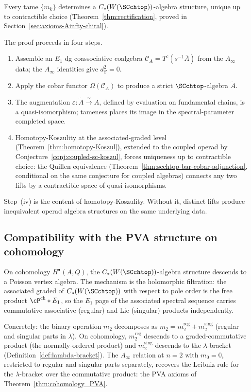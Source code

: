 Every tame $\{m_k\}$ determines a $C_\ast(W(\SCchtop))$-algebra
structure, unique up to contractible choice (Theorem~\ref{thm:rectification},
proved in Section~\ref{sec:axioms-Ainfty-chiral}).

The proof proceeds in four steps.
\begin{enumerate}[label=\textup{(\roman*)}]
\item Assemble an $E_1$ dg coassociative coalgebra $\mathcal{C}_A = T^c(s^{-1}\bar A)$
 from the $A_\infty$ data; the $A_\infty$ identities give $d_{\mathcal{C}}^2 = 0$.
\item Apply the cobar functor $\Omega(\mathcal{C}_A)$ to produce a strict
 $\SCchtop$-algebra $\widetilde A$.
\item The augmentation $\varepsilon\colon \widetilde A \xrightarrow{\;\sim\;} A$,
 defined by evaluation on fundamental chains, is a quasi-isomorphism;
 tameness places its image in the spectral-parameter completed space.
\item Homotopy-Koszulity at the associated-graded level
 (Theorem~\ref{thm:homotopy-Koszul}), extended to the coupled
 operad by Conjecture~\ref{conj:coupled-sc-koszul},
 forces uniqueness up to contractible choice: the Quillen equivalence
 (Theorem~\ref{thm:scchtop-bar-cobar-adjunction}, conditional on the
 same conjecture for coupled algebras) connects any two lifts
 by a contractible space of quasi-isomorphisms.
\end{enumerate}

Step~(iv) is the content of homotopy-Koszulity. Without it, distinct
lifts produce inequivalent operad algebra structures on the same
underlying data.

\subsection{Compatibility with the PVA structure on cohomology}
\label{subsec:compat-PVA-equiv}

On cohomology $H^\bullet(A, Q)$, the $C_\ast(W(\SCchtop))$-algebra
structure descends to a Poisson vertex algebra. The mechanism is the
holomorphic filtration: the associated graded of $C_\ast(W(\SCchtop))$
with respect to pole order is the free product $\cP^{\mathrm{ch}} * E_1$,
so the $E_1$ page of the associated spectral sequence carries
commutative-associative (regular) and Lie (singular) products
independently.

Concretely: the binary operation $m_2$ decomposes as
$m_2 = m_2^{\mathrm{reg}} + m_2^{\mathrm{sing}}$ (regular and singular
parts in $\lambda$). On cohomology, $m_2^{\mathrm{reg}}$ descends
to a graded-commutative product (the normally-ordered product) and
$m_2^{\mathrm{sing}}$ descends to the $\lambda$-bracket
(Definition~\ref{def:lambda-bracket}). The $A_\infty$ relation at
$n = 2$ with $m_0 = 0$, restricted to regular and singular parts
separately, recovers the Leibniz rule for the $\lambda$-bracket
over the commutative product: the PVA axioms of
Theorem~\ref{thm:cohomology_PVA}.

